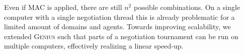\documentclass[]{article}
\begin{document}
Even if MAC is applied, there are still $n^2$ possible combinations. %
On a single computer with a single negotiation thread this is already problematic for a limited amount of domains and agents. %
Towards improving scalability, we extended G\textsc{enius} such that parts of a negotiation tournament can be run on multiple computers, effectively realizing a linear speed-up. %


\end{document}
